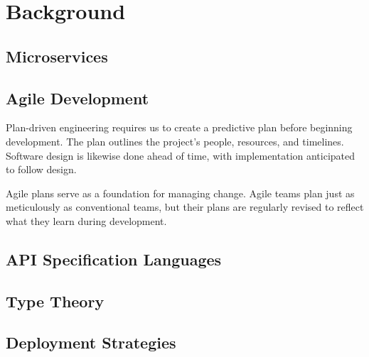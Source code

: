 
%

\chapter{Background}
\label{cha:background}

\section{Microservices} %
\label{sec:microservices}


\section{Agile Development} %
\label{sec:agile_development}

Plan-driven engineering requires us to create a predictive plan before beginning development.
The plan outlines the project's people, resources, and timelines.
Software design is likewise done ahead of time, with implementation anticipated to follow design.

Agile plans serve as a foundation for managing change.
Agile teams plan just as meticulously as conventional teams, but their plans are regularly revised to reflect what they learn during development.

\section{API Specification Languages} %
\label{sec:api_specification_languages}

\section{Type Theory} %
\label{sec:type_theory}

\section{Deployment Strategies} %
\label{sec:deployment_strategies}
